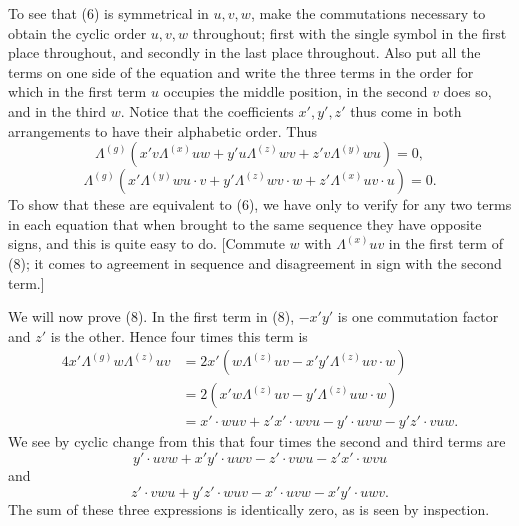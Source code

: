 \documentclass[11pt]{article}
\begin{document}
\indent To see that (6) is symmetrical in $u,v,w$, make the commutations necessary to obtain the cyclic order $u,v,w$ throughout; first with the single symbol in the first place throughout, and secondly in the last place throughout. Also put all the terms on one side of the equation and write the three terms in the order for which in the first term $u$ occupies the middle position, in the second $v$ does so, and in the third $w$. Notice that the coefficients $x',y',z'$ thus come in both arrangements to have their alphabetic order. Thus
\begin{equation}\Lambda^{(g)}(x'v\Lambda^{(x)}uw+y'u\Lambda^{(z)}wv+z'v\Lambda^{(y)}wu)=0,\tag{8}\end{equation}
\begin{equation}\Lambda^{(g)}(x'\Lambda^{(y)}wu\cdot v+y'\Lambda^{(z)}wv\cdot w+z'\Lambda^{(x)}uv\cdot u)=0.\tag{9}\end{equation}
To show that these are equivalent to (6), we have only to verify for any two terms in each equation that when brought to the same sequence they have opposite signs, and this is quite easy to do. [Commute $w$ with $\Lambda^{(x)}uv$ in the first term of (8); it comes to agreement in sequence and disagreement in sign with the second term.]

\indent We will now prove (8). In the first term in (8), $-x'y'$ is one commutation factor and $z'$ is the other. Hence four times this term is
\[\begin{aligned}4x'\Lambda^{(g)}w\Lambda^{(z)}uv&=2x'(w\Lambda^{(z)}uv-x'y'\Lambda^{(z)}uv\cdot w)\\&=2(x'w\Lambda^{(z)}uv-y'\Lambda^{(z)}uw\cdot w)\\&=x'\cdot wuv+z'x'\cdot wvu-y'\cdot uvw-y'z'\cdot vuw.\end{aligned}\]
We see by cyclic change from this that four times the second and third terms are
\[y'\cdot uvw+x'y'\cdot uwv-z'\cdot vwu-z'x'\cdot wvu\]
and
\[z'\cdot vwu+y'z'\cdot wuv-x'\cdot uvw-x'y'\cdot uwv.\]
The sum of these three expressions is identically zero, as is seen by inspection.
\end{document}
